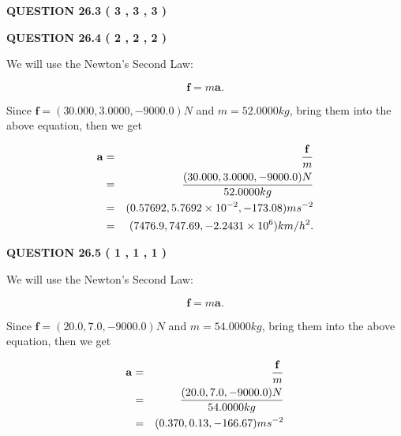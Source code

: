 \documentclass[12pt]{article}
\begin{document}
\vspace{0.2in}
  
{\textbf{\Large{QUESTION
26.3 
 (           3 ,           3 ,           3 )
}}}
  
  
  
\vspace{0.2in}
  
{\textbf{\Large{QUESTION
26.4 
 (           2 ,           2 ,           2 )
}}}
  
  
 
 

We will use the Newton's Second Law:
 
\[
\mathbf{f}=m\mathbf{a}.
\]
 
Since $\mathbf{f}=( %
30.000,  %
3.0000,  %
-9000.0 )N$
and $m= %
52.0000kg$, bring them into the above equation, then we get
 
\begin{eqnarray*}
\mathbf{a}&=&\frac{\mathbf{f}}m  \\
&=&\frac{(
30.000 ,
3.0000 ,
-9000.0 )N
}{ %
52.0000 kg}  \\
&=&(
0.57692 ,
5.7692 \times 10^{-2},
-173.08
)ms^{-2} \\
&=&(
7476.9 ,
747.69 ,
-2.2431 \times 10^{6}
)km/h^2.
\end{eqnarray*}
 
 
 
  
\vspace{0.2in}
  
{\textbf{\Large{QUESTION
26.5 
 (           1 ,           1 ,           1 )
}}}
  
  


 
 

We will use the Newton's Second Law:
 
\[
\mathbf{f}=m\mathbf{a}.
\]
 
Since $\mathbf{f}= %
(20.0 , 7.0 , -9000.0) N$
and $m= %
54.0000kg$, bring them into the above equation, then we get
 
\begin{eqnarray*}
\mathbf{a}&=&\frac{\mathbf{f}}m  \\
&=&\frac{ %
(20.0 , 7.0 , -9000.0) N}{ %
54.0000kg}  \\
&=& %
(0.370 , 0.13 , -166.67) ms^{-2}
\end{eqnarray*}
 
 
 
  
\vspace{0.2in}
  
\end{document}
